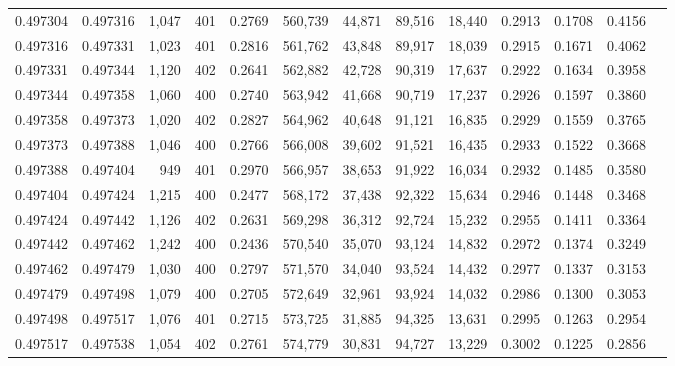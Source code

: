 \begin{tabular}{rrrrrrrrrrrrr}
0.497304 & 0.497316 & 1,047 & 401 &                                     0.2769 & 560,739 &  44,871 &  89,516 &  18,440 & 0.2913 & 0.1708 & 0.4156 \\
0.497316 & 0.497331 & 1,023 & 401 &                                     0.2816 & 561,762 &  43,848 &  89,917 &  18,039 & 0.2915 & 0.1671 & 0.4062 \\
0.497331 & 0.497344 & 1,120 & 402 &                                     0.2641 & 562,882 &  42,728 &  90,319 &  17,637 & 0.2922 & 0.1634 & 0.3958 \\
0.497344 & 0.497358 & 1,060 & 400 &                                     0.2740 & 563,942 &  41,668 &  90,719 &  17,237 & 0.2926 & 0.1597 & 0.3860 \\
0.497358 & 0.497373 & 1,020 & 402 &                                     0.2827 & 564,962 &  40,648 &  91,121 &  16,835 & 0.2929 & 0.1559 & 0.3765 \\
0.497373 & 0.497388 & 1,046 & 400 &                                     0.2766 & 566,008 &  39,602 &  91,521 &  16,435 & 0.2933 & 0.1522 & 0.3668 \\
0.497388 & 0.497404 &   949 & 401 &                                     0.2970 & 566,957 &  38,653 &  91,922 &  16,034 & 0.2932 & 0.1485 & 0.3580 \\
0.497404 & 0.497424 & 1,215 & 400 &                                     0.2477 & 568,172 &  37,438 &  92,322 &  15,634 & 0.2946 & 0.1448 & 0.3468 \\
0.497424 & 0.497442 & 1,126 & 402 &                                     0.2631 & 569,298 &  36,312 &  92,724 &  15,232 & 0.2955 & 0.1411 & 0.3364 \\
0.497442 & 0.497462 & 1,242 & 400 &                                     0.2436 & 570,540 &  35,070 &  93,124 &  14,832 & 0.2972 & 0.1374 & 0.3249 \\
0.497462 & 0.497479 & 1,030 & 400 &                                     0.2797 & 571,570 &  34,040 &  93,524 &  14,432 & 0.2977 & 0.1337 & 0.3153 \\
0.497479 & 0.497498 & 1,079 & 400 &                                     0.2705 & 572,649 &  32,961 &  93,924 &  14,032 & 0.2986 & 0.1300 & 0.3053 \\
0.497498 & 0.497517 & 1,076 & 401 &                                     0.2715 & 573,725 &  31,885 &  94,325 &  13,631 & 0.2995 & 0.1263 & 0.2954 \\
0.497517 & 0.497538 & 1,054 & 402 &                                     0.2761 & 574,779 &  30,831 &  94,727 &  13,229 & 0.3002 & 0.1225 & 0.2856 \\

\end{tabular}

